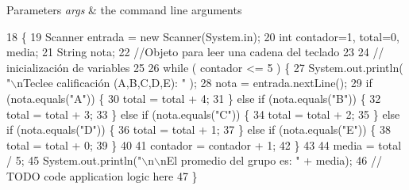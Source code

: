 \begin{DoxyParams}{Parameters}
{\em args} & the command line arguments \\
\hline
\end{DoxyParams}

\begin{DoxyCode}
18                                            \{
19       Scanner entrada = \textcolor{keyword}{new} Scanner(System.in);  
20         \textcolor{keywordtype}{int} contador=1, total=0, media;
21       String nota;
22        \textcolor{comment}{//Objeto para leer una cadena del teclado}
23  
24       \textcolor{comment}{// inicialización de variables}
25   
26        \textcolor{keywordflow}{while} ( contador <= 5 ) \{
27          System.out.println( \textcolor{stringliteral}{"\(\backslash\)nTeclee calificación (A,B,C,D,E): "} );
28          nota = entrada.nextLine();       
29          \textcolor{keywordflow}{if} (nota.equals(\textcolor{stringliteral}{"A"})) \{
30                 total = total + 4;
31          \} \textcolor{keywordflow}{else} \textcolor{keywordflow}{if} (nota.equals(\textcolor{stringliteral}{"B"})) \{
32                 total = total + 3;
33          \} \textcolor{keywordflow}{else} \textcolor{keywordflow}{if} (nota.equals(\textcolor{stringliteral}{"C"})) \{
34                 total = total + 2;
35          \} \textcolor{keywordflow}{else} \textcolor{keywordflow}{if} (nota.equals(\textcolor{stringliteral}{"D"})) \{
36                 total = total + 1;
37          \} \textcolor{keywordflow}{else} \textcolor{keywordflow}{if} (nota.equals(\textcolor{stringliteral}{"E"})) \{
38                 total = total + 0;
39          \}
40  
41          contador = contador + 1;
42       \}
43   
44       media = total / 5;
45       System.out.println(\textcolor{stringliteral}{"\(\backslash\)n\(\backslash\)nEl promedio del grupo es: "} + media);
46         \textcolor{comment}{// TODO code application logic here}
47     \}
\end{DoxyCode}
